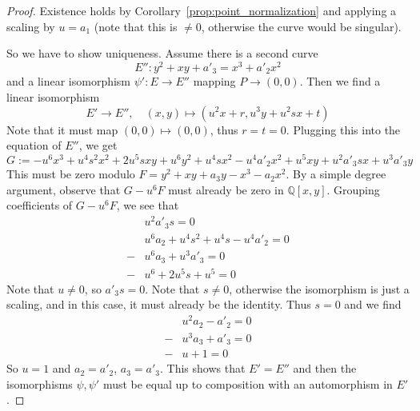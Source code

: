 \documentclass{scrartcl}
\newcommand{\Q}{\mathbb{Q}}
\theoremstyle{definition}
\begin{document}
\begin{proof}
    Existence holds by Corollary~\ref{prop:point_normalization} and applying a scaling by $u = a_1$ (note that this is $\neq 0$, otherwise the curve would be singular).

    So we have to show uniqueness.
    Assume there is a second curve
    \begin{equation*}
        E'': y^2 + x y + a'_3 = x^3 + a'_2 x^2
    \end{equation*}
    and a linear isomorphism $\psi': E \to E''$ mapping $P \to (0, 0)$.
    Then we find a linear isomorphism
    \begin{equation*}
        E' \to E'', \quad (x, y) \mapsto (u^2 x + r, u^3 y + u^2 s x + t)
    \end{equation*}
    Note that it must map $(0, 0) \mapsto (0, 0)$, thus $r = t = 0$.
    Plugging this into the equation of $E''$, we get
    \begin{equation*}
        G := -u^6 x^3 + u^4 s^2 x^2 + 2 u^5 s x y + u^6 y^2 + u^4 s x^2 - u^4 a'_2 x^2 + u^5 x y + u^2 a'_3 s x + u^3 a'_3 y
    \end{equation*}
    This must be zero modulo $F = y^2 + x y + a_3 y - x^3 - a_2 x^2$.
    By a simple degree argument, observe that $G - u^6F$ must already be zero in $\Q[x, y]$.
    Grouping coefficients of $G - u^6F$, we see that
    \begin{align*}
        &u^2 a'_3 s = 0 \\
        &u^6 a_2 + u^4 s^2 + u^4 s - u^4 a'_2 = 0 \\
        -&u^6 a_3 + u^3 a'_3 = 0 \\
        -&u^6 + 2 u^5 s + u^5 = 0
    \end{align*}
    Note that $u \neq 0$, so $a'_3 s = 0$.
    Note that $s \neq 0$, otherwise the isomorphism is just a scaling, and in this case, it must already be the identity.
    Thus $s = 0$ and we find
    \begin{align*}
        &u^2 a_2 - a'_2 = 0 \\
        -&u^3 a_3 + a'_3 = 0 \\
        -&u + 1 = 0
    \end{align*}
    So $u = 1$ and $a_2 = a'_2$, $a_3 = a'_3$.
    This shows that $E' = E''$ and then the isomorphisms $\psi, \psi'$ must be equal up to composition with an automorphism in $E'$.
\end{proof}
\end{document}
